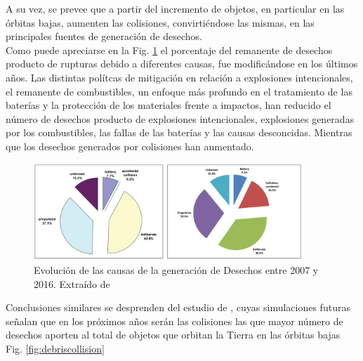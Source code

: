 A su vez, se prevee que a partir del incremento de objetos, en particular en las \'orbitas bajas, aumenten las colisiones, convirti\'endose las mismas, en las principales fuentes de generaci\'on de desechos.\\ 

Como puede apreciarse en la Fig. \ref{fig:causadesechos} el porcentaje del remanente de desechos producto de rupturas debido a diferentes causas, fue modific\'andose en los \'ultimos a\~nos. Las distintas pol\'itcas de mitigaci\'on en relaci\'on a explosiones intencionales, el remanente de combustibles, un enfoque m\'as profundo en el tratamiento de las bater\'ias y la protecci\'on de los materiales frente a impactos, han reducido el n\'umero de desechos producto de explosiones intencionales, explosiones generadas por los combustibles, las fallas de las bater\'ias y  las causas desconcidas. Mientras que los desechos generados por colisiones han aumentado.\\

\begin{figure}[!h]
  \centering
  \includegraphics[width=0.9\textwidth]{imagenes/breakupsQNews}
  \caption[Evoluci\'on de las causas de la generaci\'on de Desechos]{Evoluci\'on de las causas de la generaci\'on de Desechos entre 2007 y 2016. Extra\'ido de \citep{ODQNum}}
  \label{fig:causadesechos}
\end{figure}

Conclusiones similares se desprenden del estudio de \citep{karacalioglu2016impact}, cuyas simulaciones futuras se\~nalan que en los pr\'oximos a\~nos ser\'an las colisiones las que mayor n\'umero de desechos aporten al total de objetos que orbitan la Tierra en las \'orbitas bajas Fig. \ref{fig:debriscollision}\\

